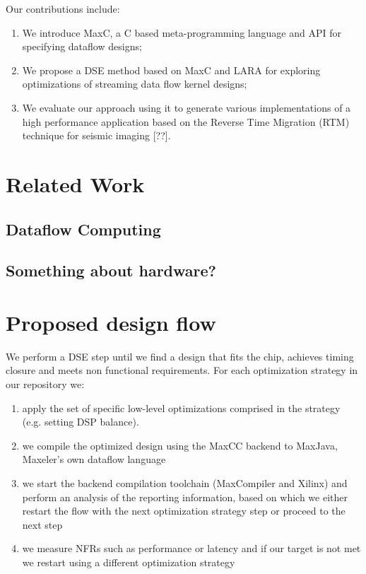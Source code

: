 \documentclass[conference]{IEEEtran}
\begin{document}
Our contributions include:
\begin{enumerate}

\item We introduce MaxC, a C based meta-programming language and API
  for specifying dataflow designs;

\item We propose a DSE method based on MaxC and LARA for exploring
  optimizations of streaming data flow kernel designs;

\item We evaluate our approach using it to generate various
  implementations of a high performance application based on the
  Reverse Time Migration (RTM) technique for seismic imaging [??].

\end{enumerate}

\section{Related Work}

\subsection{Dataflow Computing}

\subsection{Something about hardware?}

\section{Proposed design flow}

We perform a DSE step until we find a design that fits the chip,
achieves timing closure and meets non functional requirements.  For
each optimization strategy in our repository we:

\begin{enumerate}

\item apply the set of specific low-level optimizations comprised in
  the strategy (e.g. setting DSP balance).

\item  we compile the optimized
  design using the MaxCC backend to MaxJava, Maxeler's own dataflow
  language

\item we start the backend compilation toolchain (MaxCompiler
  and Xilinx) and perform an analysis of the reporting information,
  based on which we either restart the flow with the next optimization
  strategy step or proceed to the next step

\item we measure NFRs such as performance or latency and if our target
  is not met we restart using a different optimization strategy

\end{enumerate}
\end{document}
